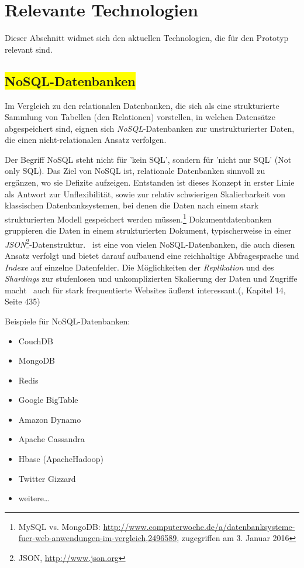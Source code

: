 \section{Relevante Technologien}

Dieser Abschnitt widmet sich den aktuellen Technologien, die für den Prototyp relevant sind.

\subsection{\colorbox{yellow}{NoSQL-Datenbanken}}

Im Vergleich zu den relationalen Datenbanken, die sich als eine strukturierte Sammlung von Tabellen (den Relationen) vorstellen, in welchen Datensätze abgespeichert sind, eignen sich \textit{NoSQL}-Datenbanken zur unstrukturierter Daten, die einen nicht-relationalen Ansatz verfolgen. 

Der Begriff NoSQL steht nicht für 'kein SQL', sondern für 'nicht nur SQL' (Not only SQL). Das Ziel von NoSQL ist, relationale Datenbanken sinnvoll zu ergänzen, wo sie Defizite aufzeigen. Entstanden ist dieses Konzept in erster Linie als Antwort zur Unflexibilität, sowie zur relativ schwierigen Skalierbarkeit von klassischen Datenbanksystemen, bei denen die Daten nach einem stark strukturierten Modell gespeichert werden müssen.\footnote{MySQL vs. MongoDB: \url{http://www.computerwoche.de/a/datenbanksysteme-fuer-web-anwendungen-im-vergleich,2496589}, zugegriffen am 3. Januar 2016} Dokumentdatenbanken gruppieren die Daten in einem strukturierten Dokument, typischerweise in einer \textit{JSON}\footnote{JSON, \url{http://www.json.org}}-Datenstruktur. \mongo\ ist eine von vielen NoSQL-Datenbanken, die auch diesen Ansatz verfolgt und bietet darauf aufbauend eine reichhaltige Abfragesprache und \textit{Indexe} auf einzelne Datenfelder. Die Möglichkeiten der \textit{Replikation} und des \textit{Shardings} zur stufenlosen und unkomplizierten Skalierung der Daten und Zugriffe macht \mongo\ auch für stark frequentierte Websites äußerst interessant.(\cite{Hollosi.2012}, Kapitel 14, Seite 435)

Beispiele für NoSQL-Datenbanken:
\begin{multicols}{2}
\begin{itemize}
\item CouchDB
\item MongoDB
\item Redis
\item Google BigTable
\item Amazon Dynamo
\item Apache Cassandra
\item Hbase (ApacheHadoop)
\item Twitter Gizzard
\item weitere…
\end{itemize}
\end{multicols}

